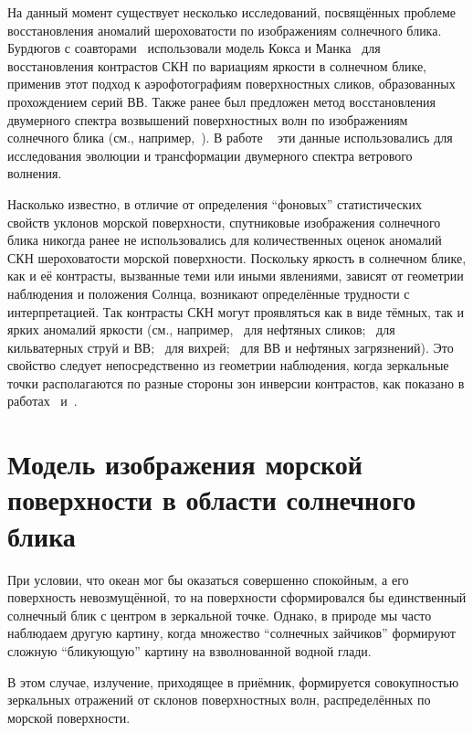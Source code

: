 На данный момент существует несколько исследований, посвящённых проблеме восстановления аномалий шероховатости по изображениям солнечного блика. Бурдюгов с соавторами~\citep{Burdyugov1987} использовали модель Кокса и Манка~\citep{Cox1954} для восстановления контрастов СКН по вариациям яркости в солнечном блике, применив этот подход к аэрофотографиям поверхностных сликов, образованных прохождением серий ВВ. Также ранее был предложен метод восстановления двумерного спектра возвышений поверхностных волн по изображениям солнечного блика (см., например,~\citep{Stilwell1969, Bolshakov1990}). В работе ~\citep{Bolshakov1990a} эти данные использовались для исследования эволюции и трансформации двумерного спектра ветрового волнения.

Насколько известно, в отличие от определения ``фоновых'' статистических свойств уклонов морской поверхности, спутниковые изображения солнечного блика никогда ранее не использовались для количественных оценок аномалий СКН шероховатости морской поверхности. Поскольку яркость в солнечном блике, как и её контрасты, вызванные теми или иными явлениями, зависят от геометрии наблюдения и положения Солнца, возникают определённые трудности с интерпретацией. Так контрасты СКН могут проявляться как в виде тёмных, так и ярких аномалий яркости (см., например,~\citep{Hu2009} для нефтяных сликов;~\citep{Matthews2005, Munk1987} для кильватерных струй и ВВ;~\citep{Munk2000} для вихрей;~\citep{Jackson2010} для ВВ и нефтяных загрязнений). Это свойство следует непосредственно из геометрии наблюдения, когда зеркальные точки располагаются по разные стороны зон инверсии контрастов, как показано в работах~\citep{Burdyugov1987} и~\citep{Jackson2010}.



\newpage

\section{Модель изображения морской поверхности в области солнечного блика} \label{sec:1.3}


При условии, что океан мог бы оказаться совершенно спокойным, а его поверхность невозмущённой, то на поверхности сформировался бы единственный солнечный блик с центром в зеркальной точке. Однако, в природе мы часто наблюдаем другую картину, когда множество ``солнечных зайчиков'' формируют сложную ``бликующую'' картину на взволнованной водной глади.

В этом случае, излучение, приходящее в приёмник, формируется совокупностью зеркальных отражений от склонов поверхностных волн, распределённых по морской поверхности.

